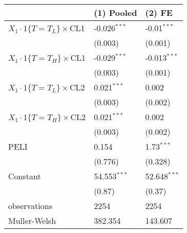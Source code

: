 \begin{tabular}{lll}
\hline
 & (1) Pooled & (2) FE \\
\hline
$X_1\cdot1\{T=T_L\}\times$CL1 & -0.026$^{***}$ & -0.01$^{***}$ \\
 & (0.003) & (0.001) \\
$X_1\cdot1\{T=T_H\}\times$CL1 & -0.029$^{***}$ & -0.013$^{***}$ \\
 & (0.003) & (0.001) \\
$X_1\cdot1\{T=T_L\}\times$CL2 & 0.021$^{***}$ & 0.002 \\
 & (0.003) & (0.002) \\
$X_1\cdot1\{T=T_H\}\times$CL2 & 0.021$^{***}$ & 0.002 \\
 & (0.003) & (0.002) \\
PELI & 0.154 & 1.73$^{***}$ \\
 & (0.776) & (0.328) \\
Constant & 54.553$^{***}$ & 52.648$^{***}$ \\
 & (0.87) & (0.37) \\\hline

observations & 2254 & 2254 \\
Muller-Welsh & 382.354 & 143.607 \\
\hline
\end{tabular}

